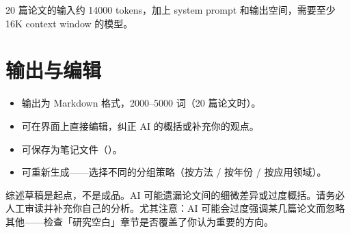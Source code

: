 20 篇论文的输入约 14000 tokens，加上 system prompt 和输出空间，需要至少
16K context window 的模型。

\section{输出与编辑}

\begin{itemize}
  \item 输出为 Markdown 格式，2000--5000 词（20 篇论文时）。
  \item 可在界面上直接编辑，纠正 AI 的概括或补充你的观点。
  \item 可保存为笔记文件（）。
  \item 可重新生成——选择不同的分组策略（按方法 / 按年份 / 按应用领域）。
\end{itemize}

\begin{warnbox}
综述草稿是起点，不是成品。AI 可能遗漏论文间的细微差异或过度概括。请务必
人工审读并补充你自己的分析。尤其注意：AI 可能会过度强调某几篇论文而忽略
其他——检查「研究空白」章节是否覆盖了你认为重要的方向。
\end{warnbox}
